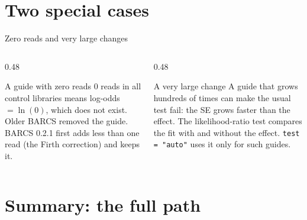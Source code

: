 \documentclass[aspectratio=169,11pt]{beamer}
\begin{document}
\section{Two special cases}

\begin{frame}{Zero reads and very large changes}
\begin{columns}[T]
\begin{column}{0.48\textwidth}
\begin{block}{A guide with zero reads}
\small
0 reads in all control libraries means log-odds $= \ln(0)$, which does not
exist. Older BARCS removed the guide. BARCS 0.2.1 first adds less than one
read (the \alert{Firth correction}) and keeps it.
\end{block}
\end{column}
\begin{column}{0.48\textwidth}
\begin{block}{A very large change}
\small
A guide that grows hundreds of times can make the usual test fail: the SE
grows faster than the effect. The \alert{likelihood-ratio test} compares
the fit with and without the effect. \texttt{test = "auto"} uses it only
for such guides.
\end{block}
\end{column}
\end{columns}
\end{frame}

\section{Summary: the full path}
\end{document}
